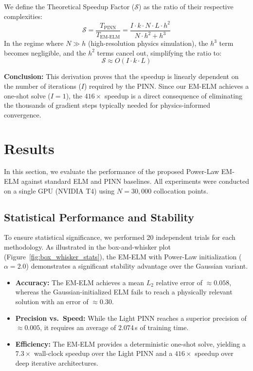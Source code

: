 \documentclass[final,12pt,3p,times,fleqn]{elsarticle}
\begin{document}
We define the Theoretical Speedup Factor ($\mathcal{S}$) as the ratio of their respective complexities:
$$\mathcal{S} = \frac{T_{\text{PINN}}}{T_{\text{EM-ELM}}} = \frac{I \cdot k \cdot N \cdot L \cdot h^2}{N \cdot h^2 + h^3}$$
In the regime where $N \gg h$ (high-resolution physics simulation), the $h^3$ term becomes negligible, and the $h^2$ terms cancel out, simplifying the ratio to:
$$\mathcal{S} \approx O(I \cdot k \cdot L)$$

\textbf{Conclusion:} This derivation proves that the speedup is linearly dependent on the number of iterations ($I$) required by the PINN. Since our EM-ELM achieves a one-shot solve ($I=1$), the $416\times$ speedup is a direct consequence of eliminating the thousands of gradient steps typically needed for physics-informed convergence.


\section{Results}
In this section, we evaluate the performance of the proposed Power-Law EM-ELM against standard ELM and PINN baselines. All experiments were conducted on a single GPU (NVIDIA T4) using $N=30{,}000$ collocation points.

\subsection{Statistical Performance and Stability}

To ensure statistical significance, we performed 20 independent trials for each methodology. As illustrated in the box-and-whisker plot (Figure~\ref{fig:box_whisker_stats}), the EM-ELM with Power-Law initialization ($\alpha=2.0$) demonstrates a significant stability advantage over the Gaussian variant.
\begin{itemize}
    \item \textbf{Accuracy:} The EM-ELM achieves a mean $L_2$ relative error of $\approx 0.058$, whereas the Gaussian-initialized ELM fails to reach a physically relevant solution with an error of $\approx 0.30$.
    \item \textbf{Precision vs.\ Speed:} While the Light PINN reaches a superior precision of $\approx 0.005$, it requires an average of 2.074\,s of training time.
    \item \textbf{Efficiency:} The EM-ELM provides a deterministic one-shot solve, yielding a $7.3\times$ wall-clock speedup over the Light PINN and a $416\times$ speedup over deep iterative architectures.
\end{itemize}
\end{document}
